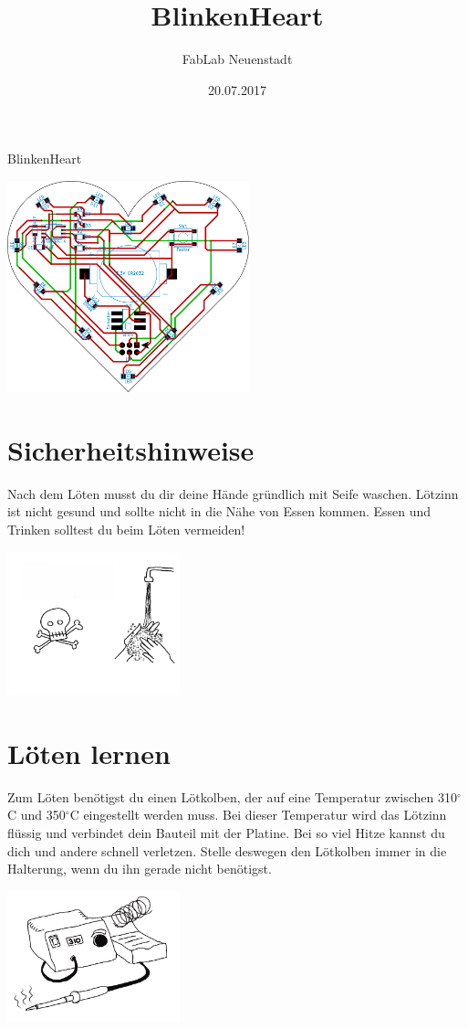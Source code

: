 \documentclass{article} %
\title{BlinkenHeart}
\author{FabLab Neuenstadt}
\date{20.07.2017}
\begin{document}
\vspace*{\fill}
\begin{center}
	{\LARGE BlinkenHeart}
\end{center}
\begin{center}
	\includegraphics[width=7cm]{Logo/Logo}
\end{center}
\vspace*{\fill}

\newpage
\section{Sicherheitshinweise}
Nach dem Löten musst du dir deine Hände gründlich mit Seife
waschen. Lötzinn ist nicht gesund und sollte nicht in die Nähe von
Essen kommen. Essen und Trinken solltest du beim Löten vermeiden!
\begin{center}
\includegraphics[width=5cm]{-000}
\end{center}

\newpage
\section{Löten lernen}
Zum Löten benötigst du einen Lötkolben, der auf eine Temperatur
zwischen 310$^\circ$C und 350$^\circ$C eingestellt werden muss. Bei dieser
Temperatur wird das Lötzinn flüssig und verbindet dein Bauteil mit der
Platine. Bei so viel Hitze kannst du dich und andere schnell verletzen.
Stelle deswegen den Lötkolben immer in die Halterung, wenn du ihn
gerade nicht benötigst.
\begin{center}
	\includegraphics[width=5cm]{-002}
\end{center}
\end{document}
